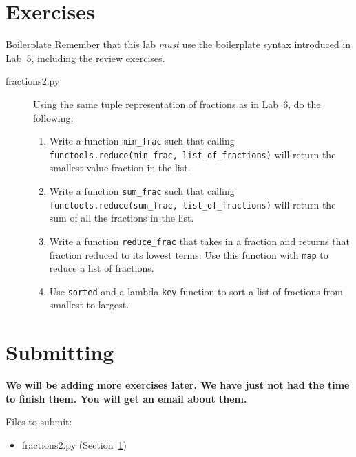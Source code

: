 \documentclass[11pt]{cselabheader}
\begin{document}
\pagebreak


\section{Exercises}
\label{sec:ex}

\begin{warningbox}{Boilerplate}
  Remember that this lab \emph{must} use the
  boilerplate syntax introduced in Lab~5, including the review exercises.
\end{warningbox}

\begin{description}
  \item[fractions2.py] Using the same tuple representation of fractions as in
    Lab~6, do the following:

    \begin{enumerate}
      \item Write a function \lstinline{min_frac} such that calling
        \lstinline{functools.reduce(min_frac, list_of_fractions)} will return
        the smallest value fraction in the list.
      \item Write a function \lstinline{sum_frac} such that calling
        \lstinline{functools.reduce(sum_frac, list_of_fractions)} will return
        the sum of all the fractions in the list.
      \item Write a function \lstinline{reduce_frac} that takes in a fraction and
        returns that fraction reduced to its lowest terms. Use this function with
        \lstinline{map} to reduce a list of fractions.
      \item Use \lstinline{sorted} and a lambda \lstinline{key} function to sort
        a list of fractions from smallest to largest.
    \end{enumerate}
\end{description}

\pagebreak
\section{Submitting}

\begin{center}
  \textbf{We will be adding more exercises later. We have just not had the time
  to finish them. You will get an email about them.}
\end{center}

Files to submit:
\begin{itemize}
  \item fractions2.py (Section~\ref{sec:ex})
\end{itemize}
\end{document}
